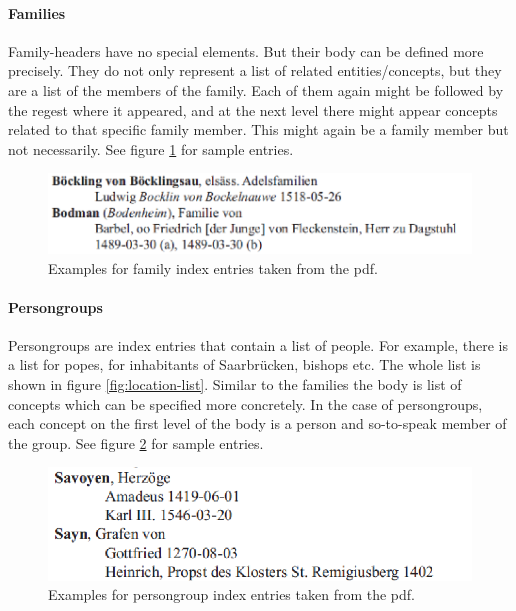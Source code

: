 \paragraph{Families}
Family-headers have no special elements. But their body can be defined more precisely. They do not only represent a list of related entities/concepts, but they are a list of the members of the family. Each of them again might be followed by the regest where it appeared, and at the next level there might appear concepts related to that specific family member. This might again be a family member but not necessarily.
See figure \ref{fig:family-example} for sample entries.

\begin{figure}[h]
  \centering
  \includegraphics[scale=0.45]{img/family-example}
  \caption{Examples for family index entries taken from the pdf.}
  \label{fig:family-example}
\end{figure}

\paragraph{Persongroups}
Persongroups are index entries that contain a list of people. For example, there is a list for popes, for inhabitants of Saarbrücken, bishops etc. The whole list is shown in figure \ref{fig:location-list}. 
Similar to the families the body is list of concepts which can be specified more concretely. In the case of persongroups, each concept on the first level of the body is a person and so-to-speak member of the group. See figure \ref{fig:persongroup-example} for sample entries.

\begin{figure}[h]
  \centering
  \includegraphics[scale=0.45]{img/persongroup-example}
  \caption{Examples for persongroup index entries taken from the pdf.}
  \label{fig:persongroup-example}
\end{figure}

